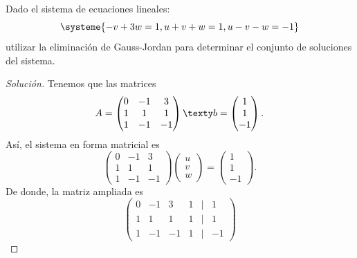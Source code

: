 \documentclass[a4,11pt]{aleph-notas}
\begin{document}
\encabezado

\begin{ejer}
    Dado el sistema de ecuaciones lineales:
    \[
        \systeme{
        -v+3w=1, u+v+w=1, u-v-w=-1
        }
    \]
    utilizar la eliminación de Gauss-Jordan para determinar el conjunto de soluciones del sistema.
\end{ejer}

\begin{proof}[Solución]
    Tenemos que las matrices
    \[
        A = \begin{pmatrix}
            0&-1&3\\1&1&1\\1&-1&-1
        \end{pmatrix}
        \texty
        b = \begin{pmatrix}
            1 \\ 1\\ -1
        \end{pmatrix}.
    \]
    Así, el sistema en forma matricial es
    \[
        \begin{pmatrix}
            0&-1&3\\1&1&1\\1&-1&-1
        \end{pmatrix}
        \begin{pmatrix}
            u \\ v\\ w
        \end{pmatrix}
        =
        \begin{pmatrix}
            1 \\ 1\\ -1
        \end{pmatrix}.
    \]
    De donde, la matriz ampliada es
    \[
        \begin{pmatrix}
            0&-1&3&1&|&1\\
            1&1&1&1&|&1\\
            1&-1&-1&1&|&-1
        \end{pmatrix}
    \]
    

\end{proof}
\end{document}
